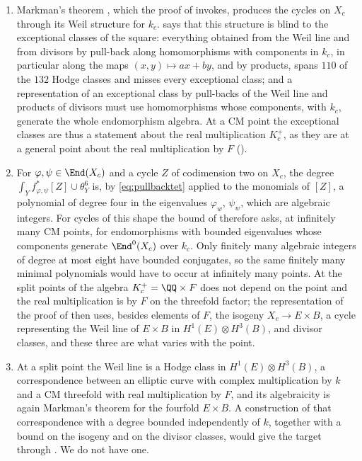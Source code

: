 \begin{remark}\label{rem:cmsource}
\leavevmode
\begin{enumerate}[label=\textup{(\arabic*)},leftmargin=2.6em,itemsep=3pt]
\item Markman's theorem \cite{Mar25a}, which the proof of
   invokes, produces the cycles on $X_{c}$ through its
  Weil structure for $k_{c}$.  says that this structure
  is blind to the exceptional classes of the square: everything obtained
  from the Weil line and from divisors by pull-back along homomorphisms with
  components in $k_{c}$, in particular along the maps $(x,y)\mapsto ax+by$,
  and by products, spans $110$ of the $132$ Hodge classes and misses every
  exceptional class; and a representation of an exceptional class by
  pull-backs of the Weil line and products of divisors must use
  homomorphisms whose components, with $k_{c}$, generate the whole
  endomorphism algebra. At a CM point the exceptional classes are thus a
  statement about the real multiplication $K_{c}^{+}$, as they are at a
  general point about the real multiplication by $F$
  ().
\item For $\varphi,\psi\in\End(X_{c})$ and a cycle $Z$ of codimension two on
  $X_{c}$, the degree $\int_{Y}f_{\varphi,\psi}^{*}[Z]\cup\theta_{Y}^{6}$
  is, by \eqref{eq:pullbacktet} applied to the monomials of $[Z]$, a
  polynomial of degree four in the eigenvalues $\varphi_{w}$, $\psi_{w}$,
  which are algebraic integers. For cycles of this shape the bound of
   therefore asks, at infinitely many CM points,
  for endomorphisms with bounded eigenvalues whose components generate
  $\End^{0}(X_{c})$ over $k_{c}$. Only finitely many algebraic integers of
  degree at most eight have bounded conjugates, so the same finitely many
  minimal polynomials would have to occur at infinitely many points. At
  the split points of  the algebra $K_{c}^{+}=\QQ\times F$
  does not depend on the point and the real multiplication is by $F$ on the
  threefold factor; the representation of the proof of 
  then uses, besides elements of $F$, the isogeny $X_{c}\to E\times B$, a
  cycle representing the Weil line of $E\times B$ in
  $H^{1}(E)\otimes H^{3}(B)$, and divisor classes, and these three are what
  varies with the point.
\item At a split point the Weil line is a Hodge class in $H^{1}(E)\otimes
  H^{3}(B)$, a correspondence between an elliptic curve with complex
  multiplication by $k$ and a CM threefold with real multiplication by $F$,
  and its algebraicity is again Markman's theorem for the fourfold
  $E\times B$. A construction of that correspondence with a degree bounded
  independently of $k$, together with a bound on the isogeny and on the
  divisor classes, would give the target through .
  We do not have one.
\end{enumerate}
\end{remark}

